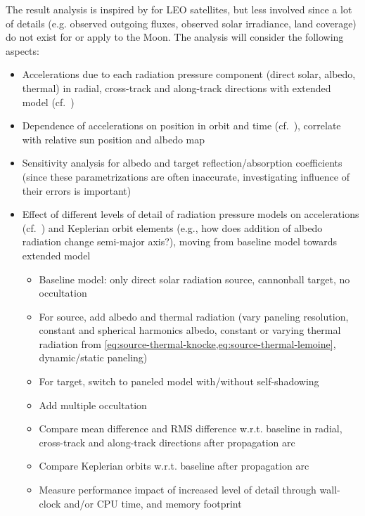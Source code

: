 \documentclass[parskip=full,DIV=15]{scrartcl}
\begin{document}
The result analysis is inspired by \textcite{Vielberg2020} for LEO satellites, but less involved since a lot of details (e.g. observed outgoing fluxes, observed solar irradiance, land coverage) do not exist for or apply to the Moon. The analysis will consider the following aspects:
\begin{itemize}
   \item Accelerations due to each radiation pressure component (direct solar, albedo, thermal) in radial, cross-track and along-track directions with extended model (cf.~\cite[Fig.~3]{Vielberg2020})
   \item Dependence of accelerations on position in orbit and time (cf.~\cite[Fig.~7]{Vielberg2020}), correlate with relative sun position and albedo map
   \item Sensitivity analysis for albedo and target reflection/absorption coefficients (since these parametrizations are often inaccurate, investigating influence of their errors is important)
   \item Effect of different levels of detail of radiation pressure models on accelerations (cf.~\cite[Fig.~8]{Vielberg2020}) and Keplerian orbit elements (e.g., how does addition of albedo radiation change semi-major axis?), moving from baseline model towards extended model
   \begin{itemize}
      \item Baseline model: only direct solar radiation source, cannonball target, no occultation
      \item For source, add albedo and thermal radiation (vary paneling resolution, constant and spherical harmonics albedo, constant or varying thermal radiation from \cref{eq:source-thermal-knocke,eq:source-thermal-lemoine}, dynamic/static paneling)
      \item For target, switch to paneled model with/without self-shadowing
      \item Add multiple occultation
      \item Compare mean difference and RMS difference w.r.t. baseline in radial, cross-track and along-track directions after propagation arc
      \item Compare Keplerian orbits w.r.t. baseline after propagation arc
      \item Measure performance impact of increased level of detail through wall-clock and/or CPU time, and memory footprint
   \end{itemize}
\end{itemize}
\end{document}
